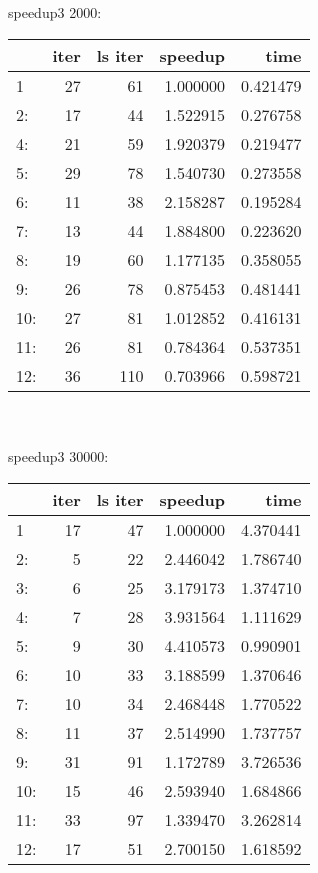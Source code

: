 \documentclass[11pt,a4paper]{article}
\begin{document}
\\ 
\\ 
speedup3 2000:
\\ 
\begin{tabular}{lrrrr}
\toprule
{} &  iter &  ls iter &   speedup &      time \\
\midrule
1   &    27 &       61 &  1.000000 &  0.421479 \\
2:  &    17 &       44 &  1.522915 &  0.276758 \\
4:  &    21 &       59 &  1.920379 &  0.219477 \\
5:  &    29 &       78 &  1.540730 &  0.273558 \\
6:  &    11 &       38 &  2.158287 &  0.195284 \\
7:  &    13 &       44 &  1.884800 &  0.223620 \\
8:  &    19 &       60 &  1.177135 &  0.358055 \\
9:  &    26 &       78 &  0.875453 &  0.481441 \\
10: &    27 &       81 &  1.012852 &  0.416131 \\
11: &    26 &       81 &  0.784364 &  0.537351 \\
12: &    36 &      110 &  0.703966 &  0.598721 \\
\bottomrule
\end{tabular}
\\ 
\\ 
speedup3 30000:
\\ 
\begin{tabular}{lrrrr}
\toprule
{} &  iter &  ls iter &   speedup &      time \\
\midrule
1   &    17 &       47 &  1.000000 &  4.370441 \\
2:  &     5 &       22 &  2.446042 &  1.786740 \\
3:  &     6 &       25 &  3.179173 &  1.374710 \\
4:  &     7 &       28 &  3.931564 &  1.111629 \\
5:  &     9 &       30 &  4.410573 &  0.990901 \\
6:  &    10 &       33 &  3.188599 &  1.370646 \\
7:  &    10 &       34 &  2.468448 &  1.770522 \\
8:  &    11 &       37 &  2.514990 &  1.737757 \\
9:  &    31 &       91 &  1.172789 &  3.726536 \\
10: &    15 &       46 &  2.593940 &  1.684866 \\
11: &    33 &       97 &  1.339470 &  3.262814 \\
12: &    17 &       51 &  2.700150 &  1.618592 \\
\bottomrule
\end{tabular}
\end{document}
